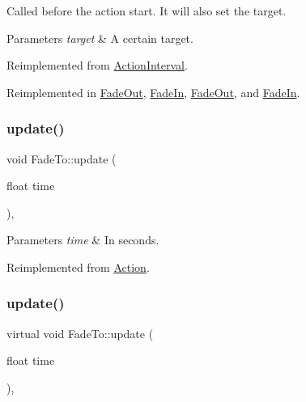 Called before the action start. It will also set the target.


\begin{DoxyParams}{Parameters}
{\em target} & A certain target. \\
\hline
\end{DoxyParams}


Reimplemented from \hyperlink{classActionInterval_ad3d91186b2c3108488ddbbdbbd982484}{Action\+Interval}.



Reimplemented in \hyperlink{classFadeOut_a95f4db5b66b8fea0e41ae9da60c3e730}{Fade\+Out}, \hyperlink{classFadeIn_ad97831da7a732a749d87634343e1711d}{Fade\+In}, \hyperlink{classFadeOut_a41e8895429e5942e43b3a60c117e0a2b}{Fade\+Out}, and \hyperlink{classFadeIn_a3a1c5c7aa1b80845aceeeb06ed059fad}{Fade\+In}.

\mbox{\label{classFadeTo_a1ce1e954d444943c1ec9923f14b3c599}} 
\subsubsection{\texorpdfstring{update()}{update()}\hspace{0.1cm}{\footnotesize\ttfamily [1/2]}}
{\footnotesize\ttfamily void Fade\+To\+::update (\begin{DoxyParamCaption}\item[{float}]{time }\end{DoxyParamCaption})\hspace{0.3cm}{\ttfamily [override]}, {\ttfamily [virtual]}}


\begin{DoxyParams}{Parameters}
{\em time} & In seconds. \\
\hline
\end{DoxyParams}


Reimplemented from \hyperlink{classAction_a937e646e63915e33ad05ba149bfcf239}{Action}.

\mbox{\label{classFadeTo_a677de8611ab23718408f8da3fe9121dc}} 
\subsubsection{\texorpdfstring{update()}{update()}\hspace{0.1cm}{\footnotesize\ttfamily [2/2]}}
{\footnotesize\ttfamily virtual void Fade\+To\+::update (\begin{DoxyParamCaption}\item[{float}]{time }\end{DoxyParamCaption})\hspace{0.3cm}{\ttfamily [override]}, {\ttfamily [virtual]}}


